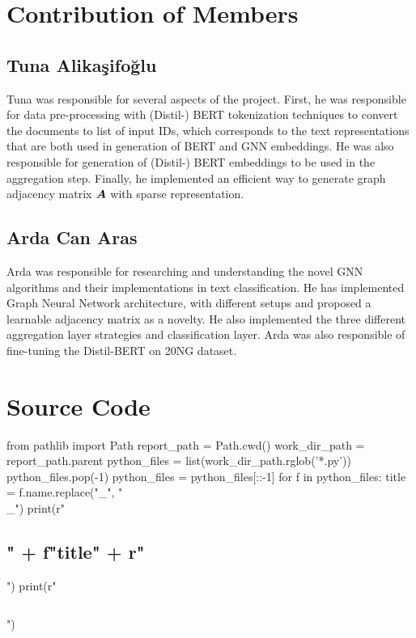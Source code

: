 \begin{appendices}
    \section{Contribution of Members}
    \subsection{Tuna Alikaşifoğlu}
    Tuna was responsible for several aspects of the project. First, he was responsible for data pre-processing with (Distil-) BERT tokenization techniques to convert the documents to list of input IDs, which corresponds to the text representations that are both used in generation of BERT and GNN embeddings. He was also responsible for generation of (Distil-) BERT embeddings to be used in the aggregation step. Finally, he implemented an efficient way to generate graph adjacency matrix \(\boldsymbol{A}\) with sparse representation.

    \subsection{Arda Can Aras}
    Arda was responsible for researching and understanding the novel GNN algorithms and their implementations in text classification. He has implemented Graph Neural Network architecture, with different setups and proposed a learnable adjacency matrix  as a novelty. He also implemented the three different aggregation layer strategies and classification layer. Arda was also responsible of fine-tuning the Distil-BERT on 20NG dataset.
    \clearpage

    \onecolumn
    \section{Source Code}
    \begin{pycode}
from pathlib import Path
report_path = Path.cwd()
work_dir_path = report_path.parent
python_files = list(work_dir_path.rglob('*.py'))
python_files.pop(-1)
python_files = python_files[::-1]
for f in python_files:
    title = f.name.replace("_", "\\_")
    print(r"\subsection{" + f"{title}" + r"}")
    print(r"\inputminted[linenos,fontsize=\scriptsize]{python}{" + f"{f}" + r"}")
\end{pycode}

\end{appendices}

